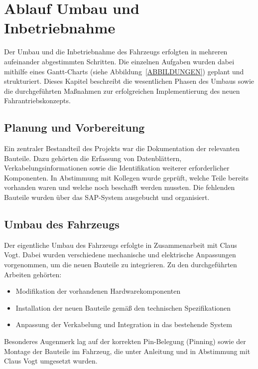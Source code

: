 \documentclass[a4paper, 12pt]{article} %
\begin{document}
\section{Ablauf Umbau und Inbetriebnahme}
\begin{spacing}{1.5}  %
    \fontsize{14pt}{14pt}\selectfont  %

Der Umbau und die Inbetriebnahme des Fahrzeugs erfolgten in mehreren aufeinander abgestimmten Schritten.
 Die einzelnen Aufgaben wurden dabei mithilfe eines Gantt-Charts (siehe Abbildung~\ref{ABBILDUNGEN}) geplant und strukturiert. 
 Dieses Kapitel beschreibt die wesentlichen Phasen des Umbaus sowie die durchgeführten 
Maßnahmen zur erfolgreichen Implementierung des neuen Fahrantriebskonzepts. 

\subsection{Planung und Vorbereitung}
Ein zentraler Bestandteil des Projekts war die Dokumentation der relevanten Bauteile. Dazu gehörten die Erfassung von Datenblättern,
 Verkabelungsinformationen sowie die Identifikation weiterer erforderlicher Komponenten. In Abstimmung mit Kollegen wurde geprüft, 
 welche Teile bereits vorhanden waren und welche noch beschafft werden mussten. Die fehlenden Bauteile wurden über das \ac{SAP}-System ausgebucht 
 und organisiert.

 \subsection{Umbau des Fahrzeugs}
 Der eigentliche Umbau des Fahrzeugs erfolgte in Zusammenarbeit mit Claus Vogt. Dabei wurden verschiedene
 mechanische und elektrische Anpassungen vorgenommen, um die neuen Bauteile zu integrieren. 
 Zu den durchgeführten Arbeiten gehörten:
 
 \begin{itemize}
    \item Modifikation der vorhandenen Hardwarekomponenten
    \item Installation der neuen Bauteile gemäß den technischen Spezifikationen
    \item  Anpassung der Verkabelung und Integration in das bestehende System
 \end{itemize}

 Besonderes Augenmerk lag auf der korrekten Pin-Belegung (Pinning) sowie der Montage der Bauteile im Fahrzeug, 
 die unter Anleitung und in Abstimmung mit Claus Vogt umgesetzt wurden.


\end{spacing}
\end{document}
